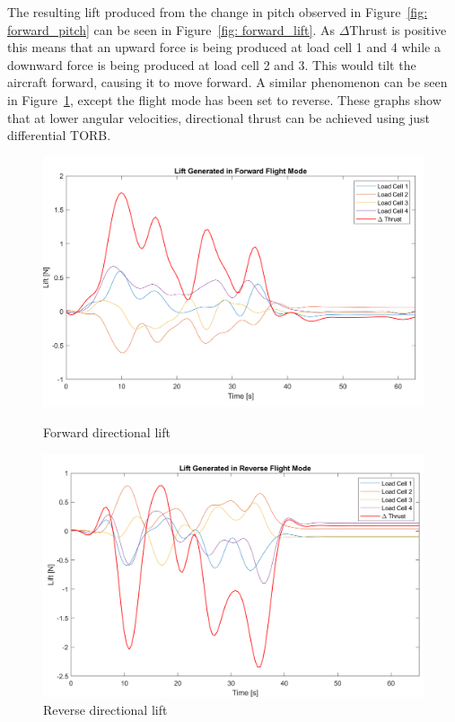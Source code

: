             The resulting lift produced from the change in pitch observed in Figure~\ref{fig: forward_pitch} can be seen in Figure~\ref{fig: forward_lift}. As \(\Delta\)Thrust is positive this means that an upward force is being produced at load cell 1 and 4 while a downward force is being produced at load cell 2 and 3. This would tilt the aircraft forward, causing it to move forward. A similar phenomenon can be seen in Figure~\ref{fig: reverse_lift}, except the flight mode has been set to reverse. These graphs show that at lower angular velocities, directional thrust can be achieved using just differential TORB. \\
            \begin{figure}[h] 
                \centering
                \begin{minipage}{0.49\textwidth}
                    \centering
                    \includegraphics*[width =\textwidth]{figs/Data_Analysis/Lift Generated-Forward Flight.png}
                    \caption{Forward directional lift}
                    \label{fig: forward_lift}
                \end{minipage}\hfill
                \begin{minipage}{0.49\textwidth}
                    \centering
                    \includegraphics*[width =\textwidth]{figs/Data_Analysis/Lift Generated-Reverse Flight.png}
                    \caption{Reverse directional lift} 
                    \label{fig: reverse_lift}
                \end{minipage}
            \end{figure} 

